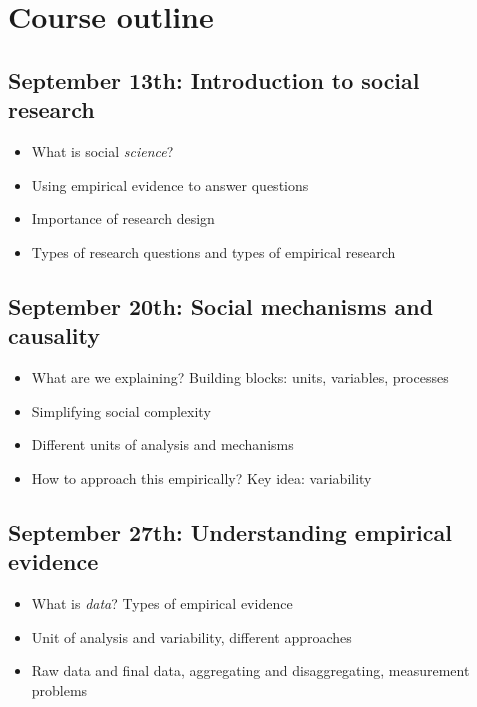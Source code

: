 \documentclass[12pt, a4paper]{article}
\begin{document}
\newpage
\section{Course outline}

\subsection*{September 13th: Introduction to social research}

\begin{itemize}
\setlength\itemsep{-5pt}
  \item What is social \textit{science}?
  \item Using empirical evidence to answer questions
  \item Importance of research design
  \item Types of research questions and types of empirical research
\end{itemize}

\subsection*{September 20th: Social mechanisms and causality}

\begin{itemize}
\setlength\itemsep{-5pt}
  \item What are we explaining? Building blocks: units, variables, processes
  \item Simplifying social complexity
  \item Different units of analysis and mechanisms
  \item How to approach this empirically? Key idea: variability
\end{itemize}

\subsection*{September 27th: Understanding empirical evidence}

\begin{itemize}
\setlength\itemsep{-5pt}
  \item What is \textit{data}? Types of empirical evidence
  \item Unit of analysis and variability, different approaches %
  \item Raw data and final data, aggregating and disaggregating, measurement problems
\end{itemize}
\end{document}

